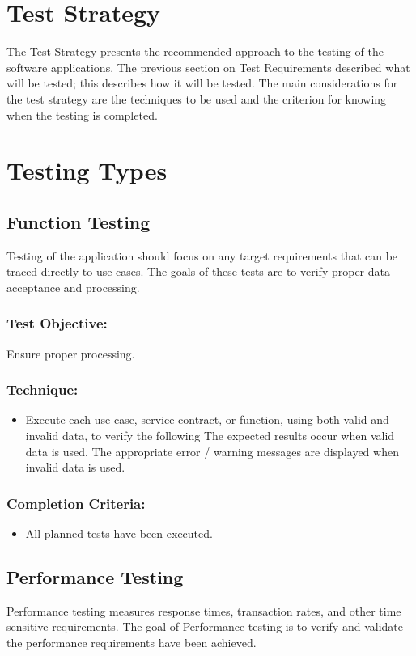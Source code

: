 \documentclass[a4paper,12pt]{report}
\begin{document}
\section {Test Strategy}
	The Test Strategy presents the recommended approach to the testing of the software applications. The previous section on Test Requirements described what will be tested; this describes how it will be tested.
	The main considerations for the test strategy are the techniques to be used and the criterion for knowing when the testing is completed.
	
	\section {Testing Types}
		\subsection {Function Testing}
			Testing of the application should focus on any target requirements that can be traced directly to use cases. 
			The goals of these tests are to verify proper data acceptance and processing.
			\subsubsection {Test Objective:}
				Ensure proper processing.
			\subsubsection {Technique:}
				\begin {itemize}
					\item Execute each use case, service contract, or function, using both valid and invalid data, to verify the following
						\subitem The expected results occur when valid data is used.
						\subitem The appropriate error / warning messages are displayed when invalid data is used.
				\end {itemize}
			\subsubsection {Completion Criteria:}
				\begin {itemize}
					\item All planned tests have been executed.
				\end {itemize}
				
		\subsection {Performance Testing}
			Performance testing measures response times, transaction rates, and other time sensitive requirements. 
			The goal of Performance testing is to verify and validate the performance requirements have been achieved. 
\end{document}
